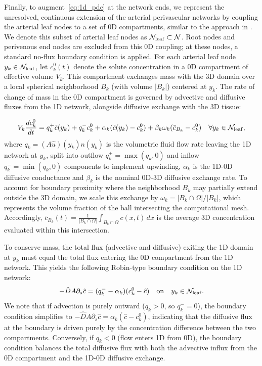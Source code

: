 \documentclass[fleqn,10pt]{wlscirep}
\begin{document}
Finally, to augment~\eqref{eq:1d_pde} at the network ends, we represent the unresolved, continuous extension of the arterial perivascular networks by coupling the arterial leaf nodes to a set of 0D compartments, similar to the approach in \cite{fritz20221d}. We denote this subset of arterial leaf nodes as $\mathcal{N}_{\rm leaf} \subset \mathcal{N}$. Root nodes and perivenous end nodes are excluded from this 0D coupling; at these nodes, a standard no-flux boundary condition is applied. For each arterial leaf node $y_k \in \mathcal{N}_{\rm leaf}$, let $c^0_k(t)$ denote the solute concentration in a 0D compartment of effective volume $V_k$. This compartment exchanges mass with the 3D domain over a local spherical neighborhood $B_k$ (with volume $|B_k|$) centered at $y_k$. The rate of change of mass in the 0D compartment is governed by advective and diffusive fluxes from the 1D network, alongside diffusive exchange with the 3D tissue:

\begin{equation}
  V_k \frac{d c^0_k}{dt} = q_k^+ \hat{c}(y_k) + q_k^- c^0_k + \alpha_k (\hat{c}(y_k) - c^0_k) + \beta_k \omega_k ( \bar{c}_{B_k} - c^0_k ) \quad \forall y_k \in \mathcal{N}_{\rm leaf},
  \label{eq:0d_ode}
\end{equation}
where $q_k = (A\hat{u})(y_k) n(y_k)$ is the volumetric fluid flow rate leaving the 1D network at $y_k$, split into outflow $q_k^+ = \max(q_k, 0)$ and inflow $q_k^- = \min(q_k, 0)$ components to implement upwinding, $\alpha_k$ is the 1D-0D diffusive conductance and $\beta_k$ is the nominal 0D-3D diffusive exchange rate. To account for boundary proximity where the neighborhood $B_k$ may partially extend outside the 3D domain, we scale this exchange by $\omega_k = |B_k \cap \Omega| / |B_k|$, which represents the volume fraction of the ball intersecting the computational mesh. Accordingly, $\bar{c}_{B_k}(t) = \frac{1}{|B_k \cap \Omega|} \int_{B_k \cap \Omega} c(x, t) \, dx$ is the average 3D concentration evaluated within this intersection.

To conserve mass, the total flux (advective and diffusive) exiting the 1D domain at $y_k$ must equal the total flux entering the 0D compartment from the 1D network. This yields the following Robin-type boundary condition on the 1D network:
\begin{equation}
  -\hat{D}A \partial_s \hat{c} = (q_k^- - \alpha_k)( c^0_k - \hat{c} ) \quad \mathrm{on} \quad y_k \in \mathcal{N}_{\rm leaf}.
  \label{eq:1d_bcs}
\end{equation}
We note that if advection is purely outward ($q_k > 0$, so $q_k^- = 0$), the boundary condition simplifies to $-\hat{D}A\partial_s\hat{c} = \alpha_k(\hat{c} - c^0_k)$, indicating that the diffusive flux at the boundary is driven purely by the concentration difference between the two compartments. Conversely, if $q_k < 0$ (flow enters 1D from 0D), the boundary condition balances the total diffusive flux with both the advective influx from the 0D compartment and the 1D-0D diffusive exchange. 
\end{document}
